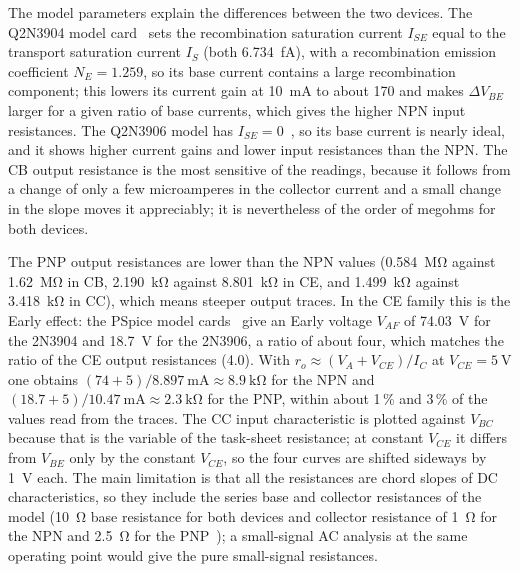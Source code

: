 \documentclass[12pt,a4paper]{article}
\begin{document}
	The model parameters explain the differences between the two devices. The
	Q2N3904 model card~\cite{ref:evallib} sets the recombination saturation current $I_{SE}$ equal to the transport saturation current $I_S$ (both \SI{6.734}{\femto\ampere}), with a recombination emission coefficient $N_E = 1.259$, so
	its base current contains a large recombination component; this lowers its
	current gain at \SI{10}{\milli\ampere} to about 170 and makes
	$\Delta V_{BE}$ larger for a given ratio of base currents, which gives the
	higher NPN input resistances. The Q2N3906 model has $I_{SE} = 0$~\cite{ref:evallib}, so its base
	current is nearly ideal, and it shows higher current gains and lower input
	resistances than the NPN. The CB output resistance is the most sensitive
	of the readings, because it follows from a change of only a few
	microamperes in the collector current and a small change in the slope
	moves it appreciably; it is nevertheless of the order of megohms for both
	devices.

	The PNP output resistances are lower than the NPN values
	(\SI{0.584}{\mega\ohm} against \SI{1.62}{\mega\ohm} in CB,
	\SI{2.190}{\kilo\ohm} against \SI{8.801}{\kilo\ohm} in CE, and
	\SI{1.499}{\kilo\ohm} against \SI{3.418}{\kilo\ohm} in CC), which means
	steeper output traces. In the CE family this is the Early effect: the
	PSpice model cards~\cite{ref:evallib} give an Early voltage $V_{AF}$ of
	\SI{74.03}{\volt} for the 2N3904 and \SI{18.7}{\volt} for the 2N3906, a ratio of about
	four, which matches the ratio of the CE output resistances (4.0).
	With $r_o \approx (V_A + V_{CE})/I_C$ at $V_{CE} = \SI{5}{\volt}$ one
	obtains $(74 + 5)/\SI{8.897}{\milli\ampere} \approx \SI{8.9}{\kilo\ohm}$
	for the NPN and $(18.7 + 5)/\SI{10.47}{\milli\ampere} \approx
	\SI{2.3}{\kilo\ohm}$ for the PNP, within about 1\,\% and 3\,\% of the
	values read from the traces. The CC
	input characteristic is plotted against $V_{BC}$ because that is the
	variable of the task-sheet resistance; at constant $V_{CE}$ it differs
	from $V_{BE}$ only by the constant $V_{CE}$, so the four curves are
	shifted sideways by \SI{1}{\volt} each. The main limitation is that all
	the resistances are chord slopes of DC characteristics, so they include
	the series base and collector resistances of the model (\SI{10}{\ohm} base resistance for both devices and
	collector resistance of \SI{1}{\ohm} for the NPN and \SI{2.5}{\ohm} for the PNP~\cite{ref:evallib}); a small-signal AC
	analysis at the same operating point would give the pure small-signal
	resistances.
\end{document}
